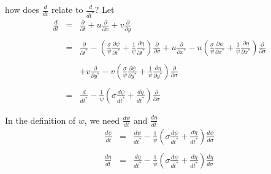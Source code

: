 \documentclass[oribibl]{llncs}
\begin{document}
how does $\frac{d}{dt}$ relate to $\frac{d}{d t^*}$? Let
\begin{eqnarray}  
\frac{d}{dt} &=& \frac{\partial}{\partial t} + u\frac{\partial}{\partial x} +v\frac{\partial}{\partial  y}  \nonumber \\ \nonumber \\ 
&=& \frac{\partial}{\partial t^*} - \left(  \frac{\sigma}{\psi} \frac{\partial \psi}{\partial t^*} + \frac{1}{\psi}\frac{\partial \eta}{\partial t^*}\right) \frac{\partial}{\partial \sigma} + u \frac{\partial}{\partial x^*} - u \left(  \frac{\sigma}{\psi} \frac{\partial \psi}{\partial x^*} + \frac{1}{\psi}\frac{\partial \eta}{\partial x^*}\right) \frac{\partial}{\partial \sigma} \nonumber \\ \nonumber \\ 
&& + v \frac{\partial}{\partial y^*} - v \left(  \frac{\sigma}{\psi} \frac{\partial \psi}{\partial y^*} + \frac{1}{\psi}\frac{\partial \eta}{\partial y^*}\right) \frac{\partial}{\partial \sigma}  \nonumber \\ \nonumber \\
&=&\frac{d}{dt^*} -\frac{1}{\psi} \left( \sigma \frac{d\psi}{dt^*} +\frac{d \eta}{dt^*} \right) \frac{\partial}{\partial \sigma}
\end{eqnarray}  

In the definition of $w$, we need $\frac{d\psi}{dt}$ and $\frac{d \eta}{dt}$
\begin{eqnarray}  
\frac{d \psi}{d t} &=&\frac{d\psi}{dt^*} -\frac{1}{\psi}\left( \sigma \frac{d\psi}{dt^*} +\frac{d \eta}{dt^*} \right) \frac{d \psi}{d \sigma} \nonumber \\ \nonumber \\
\frac{d \eta}{d t} &=&\frac{d\eta}{dt^*} -\frac{1}{\psi}\left( \sigma \frac{d\psi}{dt^*} +\frac{d \eta}{dt^*} \right) \frac{d \eta}{d \sigma}
\end{eqnarray}  
\end{document}
